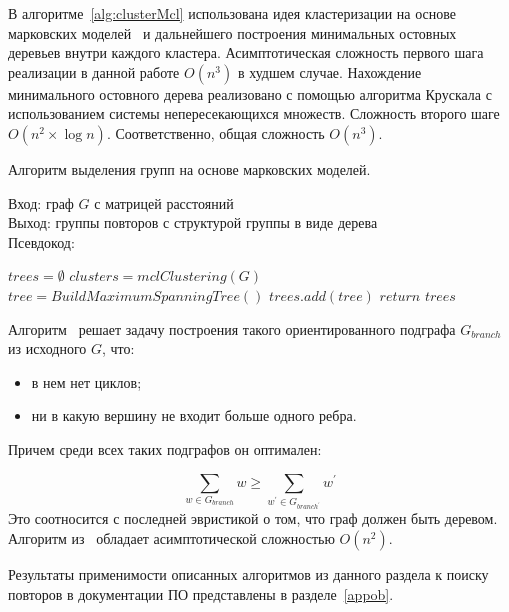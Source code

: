 В алгоритме~\ref{alg:clusterMcl} использована идея кластеризации на основе марковских моделей~\cite{dongen2000cluster} и дальнейшего построения минимальных остовных деревьев внутри каждого кластера.
 Асимптотическая сложность первого шага реализации в данной работе $O(n^3)$ в худшем случае.
 Нахождение минимального остовного дерева реализовано с помощью алгоритма Крускала с использованием системы непересекающихся множеств. Сложность второго шаге $O(n^2 \times \log n)$.
 Соответственно, общая сложность $O(n^3)$.

\begin{algorithm}[t!]
\caption{Алгоритм выделения групп на основе марковских моделей.}\label{alg:clusterMcl}
Вход: граф $G$ с матрицей расстояний\\
Выход: группы повторов с структурой группы в виде дерева\\
Псевдокод:
\begin{algorithmic}[1]
\State $trees = \emptyset$
\State $ clusters = mclClustering(G)$
\State $tree =  BuildMaximumSpanningTree()$
\State $trees.add(tree)$
\EndFor
\State
\State $return$ $trees$
\end{algorithmic}
\end{algorithm}


Алгоритм~\cite{tofigh2009optimum}  решает задачу построения такого ориентированного подграфа $G_{branch}$ из исходного $G$, что:
\begin{itemize}
    \item в нем нет циклов;
    \item ни в какую вершину не входит больше одного ребра.
\end{itemize}

Причем среди всех таких подграфов он оптимален:

\begin{equation}
\sum_{w \in G_{branch}} w \geq \sum_{w^{'} \in G_{branch^{'}}} w^{'}
\end{equation}
Это соотносится с последней эвристикой о том, что граф должен быть деревом.
Алгоритм из~\cite{tofigh2009optimum} обладает асимптотической сложностью $O(n^2)$.

%  

\vspace{10 mm}
Результаты применимости описанных алгоритмов из данного раздела к поиску повторов в документации ПО представлены в разделе~\ref{appob}.


